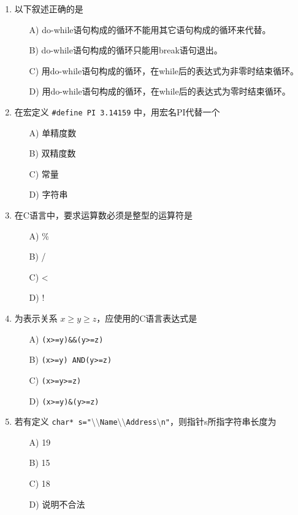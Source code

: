 \documentclass[a4paper,12pt]{article}
\begin{document}
\begin{enumerate}
	\item 以下叙述正确的是
	      \begin{enumerate}
		      \item[A)] do-while语句构成的循环不能用其它语句构成的循环来代替。
		      \item[B)] do-while语句构成的循环只能用break语句退出。
		      \item[C)] 用do-while语句构成的循环，在while后的表达式为非零时结束循环。
		      \item[D)] 用do-while语句构成的循环，在while后的表达式为零时结束循环。
	      \end{enumerate}
	      \vspace{0.3cm}

	\item 在宏定义 \texttt{\#define PI 3.14159} 中，用宏名PI代替一个
	      \begin{enumerate}
		      \item[A)] 单精度数
		      \item[B)] 双精度数
		      \item[C)] 常量
		      \item[D)] 字符串
	      \end{enumerate}
	      \vspace{0.3cm}

	\item 在C语言中，要求运算数必须是整型的运算符是
	      \begin{enumerate}
		      \item[A)] \%
		      \item[B)] /
		      \item[C)] <
		      \item[D)] !
	      \end{enumerate}
	      \vspace{0.3cm}

	\item 为表示关系 $x \ge y \ge z$，应使用的C语言表达式是
	      \begin{enumerate}
		      \item[A)] \texttt{(x>=y)\&\&(y>=z)}
		      \item[B)] \texttt{(x>=y) AND(y>=z)}
		      \item[C)] \texttt{(x>=y>=z)}
		      \item[D)] \texttt{(x>=y)\&(y>=z)}
	      \end{enumerate}
	      \vspace{0.3cm}

	\item 若有定义 \texttt{char* s="$\setminus\setminus$Name$\setminus\setminus$Address$\setminus$n"}，则指针s所指字符串长度为
	      \begin{enumerate}
		      \item[A)] 19
		      \item[B)] 15
		      \item[C)] 18
		      \item[D)] 说明不合法
	      \end{enumerate}
	      \vspace{0.3cm}


\end{enumerate}
\end{document}
